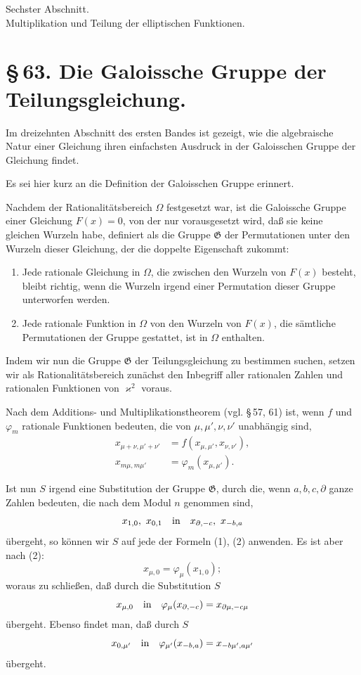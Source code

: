 \documentclass[11pt]{article}
\begin{document}
\begin{center}
{\large Sechster Abschnitt.}\\[0.7em]
{\Large Multiplikation und Teilung der elliptischen Funktionen.}
\end{center}

\section*{\S\,63. Die Galoissche Gruppe der Teilungsgleichung.}

Im dreizehnten Abschnitt des ersten Bandes ist gezeigt, wie die algebraische Natur einer
Gleichung ihren einfachsten Ausdruck in der Galoisschen Gruppe der Gleichung findet.

Es sei hier kurz an die Definition der Galoisschen Gruppe erinnert.

Nachdem der Rationalitätsbereich $\Omega$ festgesetzt war, ist die Galoissche Gruppe einer
Gleichung $F(x)=0$, von der nur vorausgesetzt wird, daß sie keine gleichen Wurzeln habe,
definiert als die Gruppe $\mathfrak G$ der Permutationen unter den Wurzeln dieser Gleichung,
der die doppelte Eigenschaft zukommt:
\begin{enumerate}[label=\alph*)]
\item Jede rationale Gleichung in $\Omega$, die zwischen den Wurzeln von $F(x)$ besteht,
bleibt richtig, wenn die Wurzeln irgend einer Permutation dieser Gruppe unterworfen werden.
\item Jede rationale Funktion in $\Omega$ von den Wurzeln von $F(x)$, die sämtliche
Permutationen der Gruppe gestattet, ist in $\Omega$ enthalten.
\end{enumerate}

Indem wir nun die Gruppe $\mathfrak G$ der Teilungsgleichung zu bestimmen suchen, setzen
wir als Rationalitätsbereich zunächst den Inbegriff aller rationalen Zahlen und rationalen
Funktionen von $\varkappa^2$ voraus.

Nach dem Additions- und Multiplikationstheorem (vgl. \S\,57, 61) ist, wenn $f$ und
$\varphi_m$ rationale Funktionen bedeuten, die von $\mu,\mu',\nu,\nu'$ unabhängig sind,
\begin{align}
 x_{\mu+\nu,\mu'+\nu'}&=f(x_{\mu,\mu'},x_{\nu,\nu'}),\tag{1}\\
 x_{m\mu,m\mu'}&=\varphi_m(x_{\mu,\mu'}).\tag{2}
\end{align}

Ist nun $S$ irgend eine Substitution der Gruppe $\mathfrak G$, durch die, wenn
$a,b,c,\partial$ ganze Zahlen bedeuten, die nach dem Modul $n$ genommen sind,
\[
 x_{1,0},\ x_{0,1}\quad\hbox{in}\quad x_{\partial,-c},\ x_{-b,a}
\]
übergeht, so können wir $S$ auf jede der Formeln (1), (2) anwenden. Es ist aber nach (2):
\[
 x_{\mu,0}=\varphi_\mu(x_{1,0});
\]
woraus zu schließen, daß durch die Substitution $S$
\[
 x_{\mu,0}\quad\hbox{in}\quad \varphi_\mu(x_{\partial,-c})=x_{\partial\mu,-c\mu}
\]
übergeht. Ebenso findet man, daß durch $S$
\[
 x_{0,\mu'}\quad\hbox{in}\quad \varphi_{\mu'}(x_{-b,a})=x_{-b\mu',a\mu'}
\]
übergeht.
\end{document}
